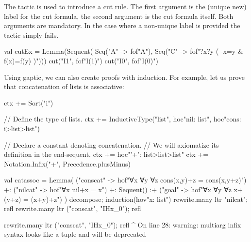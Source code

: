 \documentclass[a4paper,11pt]{book}
\newcommand{\cli}[1]{{\ttfamily {#1}}}
\begin{document}
The \cli{cut} tactic is used to introduce a cut rule. The first argument is the
(unique new) label for the cut formula, the second argument is the cut formula
itself. Both arguments are mandatory. In the case where a non-unique label is
provided the tactic simply fails.
\begin{tacticslisting}
val cutEx = Lemma(Sequent(
    Seq("A" -> fof"A"),
    Seq("C" -> fof"?x?y ( -x=y & f(x)=f(y) )"))) {
  cut("I1", fof"I(1)")
  cut("I0", fof"I(0)")
}
\end{tacticslisting}

Using gaptic, we can also create proofs with induction.  For example, let us
prove that concatenation of lists is associative:

\begin{tacticslisting}[nosig]
ctx += Sort("i")

// Define the type of lists.
ctx += InductiveType("list",
  hoc"nil: list",
  hoc"cons: i>list>list")

// Declare a constant denoting concatenation.
// We will axiomatize its definition in the end-sequent.
ctx += hoc"'+': list>list>list"
ctx += Notation.Infix("+", Precedence.plusMinus)

val catassoc =
  Lemma(
      ("conscat" -> hof"∀x ∀y ∀z cons(x,y)+z = cons(x,y+z)") +:
      ("nilcat" -> hof"∀x nil+x = x") +:
      Sequent()
      :+ ("goal" -> hof"∀x ∀y ∀z x+(y+z) = (x+y)+z")
    ) {
  decompose; induction(hov"x: list")
  rewrite.many ltr "nilcat"; refl
  rewrite.many ltr ("conscat", "IHx_0"); refl
}
\end{tacticslisting}
\begin{tacticsoutput}
        rewrite.many ltr ("conscat", "IHx_0"); refl
                     ^
On line 28: warning: multiarg infix syntax looks like a tuple and will be deprecated
\end{tacticsoutput}
\end{document}
